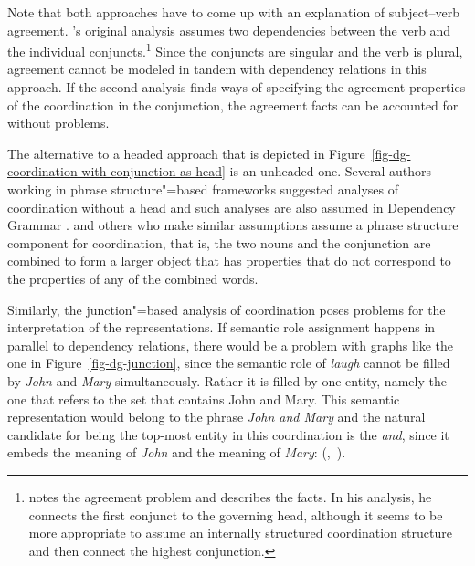 Note that both approaches have to come up with an explanation of subject--verb agreement. \tes's
original analysis assumes two dependencies between the verb and the individual conjuncts.\footnote{
  \citet[]{Eroms2000a} notes the agreement problem and describes the facts. In his
  analysis, he connects the first conjunct to the governing head, although it seems to be more
  appropriate to assume an internally structured coordination structure and then connect the highest conjunction.
} Since the conjuncts are singular and the verb is plural, agreement cannot be modeled in tandem with dependency
relations in this approach. 
If the second analysis finds ways of specifying the agreement properties
of the coordination in the conjunction, the agreement facts can be accounted for without problems.

The alternative to a headed approach that is depicted in
Figure~\ref{fig-dg-coordination-with-conjunction-as-head} is an unheaded one. Several authors
working in phrase structure"=based frameworks suggested analyses of coordination without a head and
such analyses are also assumed in Dependency Grammar \citep{Hudson88a,Kahane97a}. \citet{Hudson88a}
and others who make similar assumptions assume a phrase structure component for
coordination, that
is, the two nouns and the conjunction are combined to form a larger object that has properties that
do not correspond to the properties of any of the combined words.


Similarly, the junction"=based analysis of coordination poses problems for the interpretation of the
representations. If semantic role assignment happens in parallel to dependency relations, there would be a
problem with graphs like the one in Figure~\ref{fig-dg-junction}, since the semantic role of \emph{laugh} cannot be
filled by \emph{John} and \emph{Mary} simultaneously. Rather it is filled by one entity, namely the
one that refers to the set that contains John and Mary. This semantic representation would belong to
the phrase \emph{John and Mary} and the natural candidate for being the top-most entity in this
coordination is the \emph{and}, since it embeds the meaning of \emph{John} and the meaning of
\emph{Mary}: (,~).

